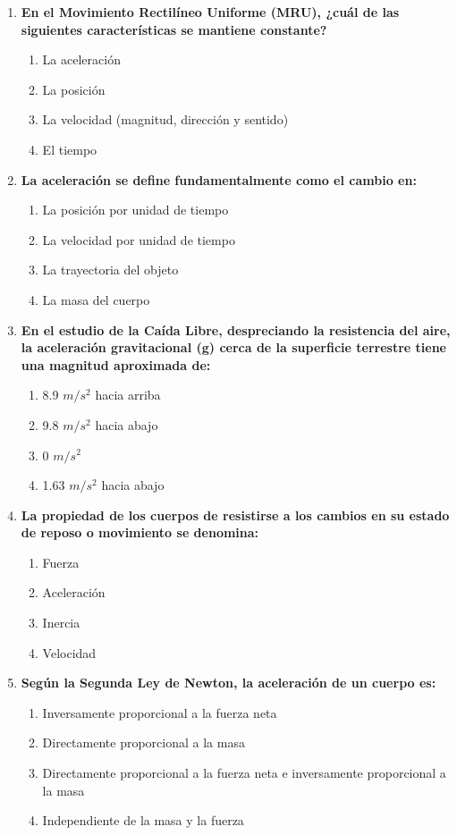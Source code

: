 \documentclass[12pt]{article}
\begin{document}
\begin{enumerate}[label=\arabic*.]
    \item \textbf{En el Movimiento Rectilíneo Uniforme (MRU), ¿cuál de las siguientes características se mantiene constante?}
    \begin{enumerate}[label=\alph*)]
        \item La aceleración
        \item La posición
        \item La velocidad (magnitud, dirección y sentido)
        \item El tiempo
    \end{enumerate}

    \item \textbf{La aceleración se define fundamentalmente como el cambio en:}
    \begin{enumerate}[label=\alph*)]
        \item La posición por unidad de tiempo
        \item La velocidad por unidad de tiempo
        \item La trayectoria del objeto
        \item La masa del cuerpo
    \end{enumerate}

    \item \textbf{En el estudio de la Caída Libre, despreciando la resistencia del aire, la aceleración gravitacional (g) cerca de la superficie terrestre tiene una magnitud aproximada de:}
    \begin{enumerate}[label=\alph*)]
        \item 8.9 $m/s^2$ hacia arriba
        \item 9.8 $m/s^2$ hacia abajo
        \item 0 $m/s^2$
        \item 1.63 $m/s^2$ hacia abajo
    \end{enumerate}

    \item \textbf{La propiedad de los cuerpos de resistirse a los cambios en su estado de reposo o movimiento se denomina:}
    \begin{enumerate}[label=\alph*)]
        \item Fuerza
        \item Aceleración
        \item Inercia
        \item Velocidad
    \end{enumerate}

    \item \textbf{Según la Segunda Ley de Newton, la aceleración de un cuerpo es:}
    \begin{enumerate}[label=\alph*)]
        \item Inversamente proporcional a la fuerza neta
        \item Directamente proporcional a la masa
        \item Directamente proporcional a la fuerza neta e inversamente proporcional a la masa
        \item Independiente de la masa y la fuerza
    \end{enumerate}


\end{enumerate}
\end{document}
